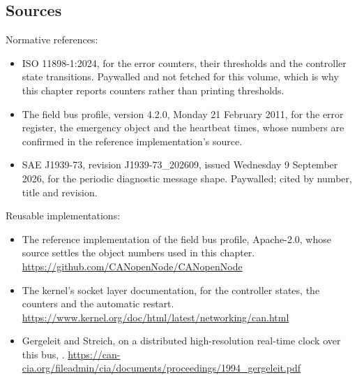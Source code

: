 \subsection*{Sources}

Normative references:
\begin{itemize}
\item ISO 11898-1:2024, for the error counters, their thresholds and the
controller state transitions. Paywalled and not fetched for this volume, which
is why this chapter reports counters rather than printing thresholds.
\item The field bus profile, version 4.2.0, Monday 21 February 2011, for the
error register, the emergency object and the heartbeat times, whose numbers are
confirmed in the reference implementation's source.
\item SAE J1939-73, revision J1939-73\_202609, issued Wednesday 9 September
2026, for the periodic diagnostic message shape. Paywalled; cited by number,
title and revision.
\end{itemize}

Reusable implementations:
\begin{itemize}
\item The reference implementation of the field bus profile, Apache-2.0, whose
source settles the object numbers used in this chapter.\newline
\url{https://github.com/CANopenNode/CANopenNode}
\item The kernel's socket layer documentation, for the controller states, the
counters and the automatic restart.\newline
\url{https://www.kernel.org/doc/html/latest/networking/can.html}
\item Gergeleit and Streich, on a distributed high-resolution real-time clock
over this bus, .\newline
\url{https://can-cia.org/fileadmin/cia/documents/proceedings/1994_gergeleit.pdf}
\end{itemize}
